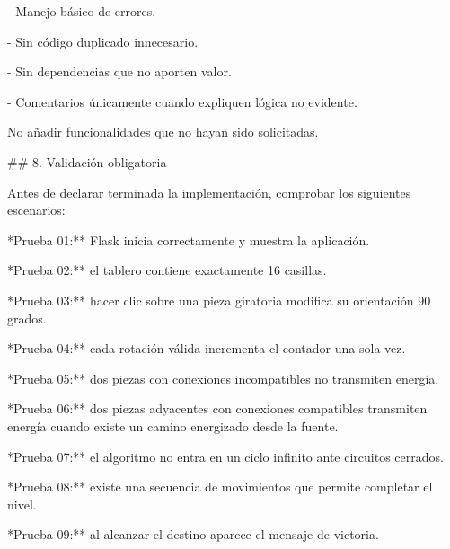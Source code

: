 \noindent - Manejo básico de errores.\par
\noindent - Sin código duplicado innecesario.\par
\noindent - Sin dependencias que no aporten valor.\par
\noindent - Comentarios únicamente cuando expliquen lógica no evidente.\par
\par\smallskip
\noindent No añadir funcionalidades que no hayan sido solicitadas.\par
\par\smallskip
\noindent \#\# 8. Validación obligatoria\par
\par\smallskip
\noindent Antes de declarar terminada la implementación, comprobar los siguientes escenarios:\par
\par\smallskip
\noindent **Prueba 01:** Flask inicia correctamente y muestra la aplicación.\par
\par\smallskip
\noindent **Prueba 02:** el tablero contiene exactamente 16 casillas.\par
\par\smallskip
\noindent **Prueba 03:** hacer clic sobre una pieza giratoria modifica su orientación 90 grados.\par
\par\smallskip
\noindent **Prueba 04:** cada rotación válida incrementa el contador una sola vez.\par
\par\smallskip
\noindent **Prueba 05:** dos piezas con conexiones incompatibles no transmiten energía.\par
\par\smallskip
\noindent **Prueba 06:** dos piezas adyacentes con conexiones compatibles transmiten energía cuando existe un camino energizado desde la fuente.\par
\par\smallskip
\noindent **Prueba 07:** el algoritmo no entra en un ciclo infinito ante circuitos cerrados.\par
\par\smallskip
\noindent **Prueba 08:** existe una secuencia de movimientos que permite completar el nivel.\par
\par\smallskip
\noindent **Prueba 09:** al alcanzar el destino aparece el mensaje de victoria.\par
\par\smallskip
